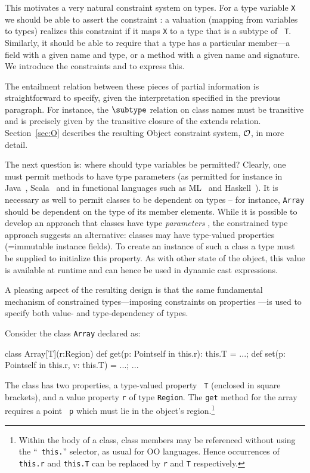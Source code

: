This motivates a very natural constraint system on types.  For a type
variable {\tt X} we should be able to assert the constraint 
\subtype {}: a valuation (mapping from variables to types) realizes
this constraint if it maps {\tt X} to a type that is a subtype of {\tt
T}. Similarly, it should be able to require that a type has a
particular member---a field with a given name and type, or a method
with a given name and signature. We introduce the constraints 
 and  to express this.

The entailment relation between these pieces of partial information is
straightforward to specify, given the interpretation specified in the
previous paragraph. For instance, the $\subtype$ relation on class
names must be transitive and is precisely given by the transitive
closure of the extends relation.
Section~\ref{sec:O} describes the
resulting Object constraint system, $\cal O$, in more detail.

The next question is: where should type variables be permitted?
Clearly, one must permit methods to have type parameters (as permitted
for instance in Java~\cite{Java3}, Scala~\cite{scala} and in
functional languages such as ML~\cite{ml} and Haskell~\cite{haskell}).
It is necessary as well to permit classes to be dependent on types --
for instance, {\tt Array} should be dependent on the type of its
member elements. While it is possible to develop an approach that
classes have type {\em parameters} \cite{Java3}, the constrained
type approach suggests an alternative: classes may have type-valued
properties (=immutable instance fields). To create an instance of such
a class a type must be supplied to initialize this property. As with
other state of the object, this value is available at runtime and
can hence be used in dynamic cast expressions.

A pleasing aspect of the resulting design is that the same fundamental
mechanism of constrained types---imposing constraints on properties
---is used to specify both value- and type-dependency of types.

\begin{example}[Array]
  Consider the class {\tt Array} declared as:
{\footnotesize
\begin{xten}
class Array[T](r:Region) {
  def get(p: Point{self in this.r}): this.T = ...;
  def set(p: Point{self in this.r}, v: this.T) = ...;
  ...
}
\end{xten}}
{}\noindent The class has two properties, a type-valued property {\tt
T} (enclosed in square brackets), and a value property {\tt r} of type
{\tt Region}. The {\tt get} method for the array requires a point {\tt
p} which must lie in the object's region.\footnote{Within the body of
a class, class members may be referenced without using the ``{\tt
this.}'' selector, as usual for OO languages. Hence occurrences of
{\tt this.r} and {\tt this.T} can be replaced by {\tt r} and {\tt T}
respectively.}
\end{example}

